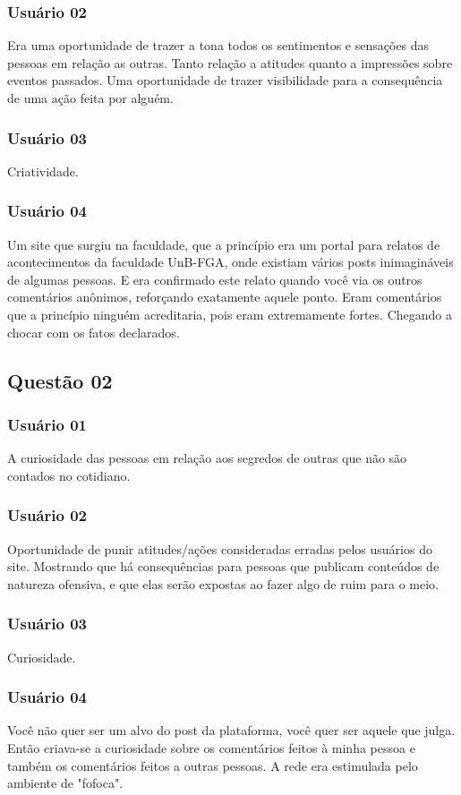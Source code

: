 \subsubsection{Usuário 02}
Era uma oportunidade de trazer a tona todos os sentimentos e sensações das pessoas
em relação as outras. Tanto relação a atitudes quanto a impressões sobre eventos
passados. Uma oportunidade de trazer visibilidade para a consequência de uma ação
feita por alguém.
\subsubsection{Usuário 03}
Criatividade.
\subsubsection{Usuário 04}
Um site que surgiu na faculdade, que a princípio era um portal para relatos de
acontecimentos da faculdade UnB-FGA, onde existiam vários posts inimagináveis
de algumas pessoas. E era confirmado este relato quando você via os outros comentários
anônimos, reforçando exatamente aquele ponto. Eram comentários que a princípio ninguém
acreditaria, pois eram extremamente fortes. Chegando a chocar com os fatos
declarados.

\subsection{Questão 02}
\subsubsection{Usuário 01}
A curiosidade das pessoas em relação aos segredos de outras que não são contados no cotidiano.
\subsubsection{Usuário 02}
Oportunidade de punir atitudes/ações consideradas erradas pelos usuários do site. Mostrando que há consequências para pessoas que publicam conteúdos de natureza ofensiva, e que elas serão expostas ao fazer algo de ruim para o meio.
\subsubsection{Usuário 03}
Curiosidade.
\subsubsection{Usuário 04}
Você não quer ser um alvo do post da plataforma, você quer ser aquele que julga.
Então criava-se a curiosidade sobre os comentários feitos à minha pessoa e também
os comentários feitos a outras pessoas. 
A rede era estimulada pelo ambiente de "fofoca".

